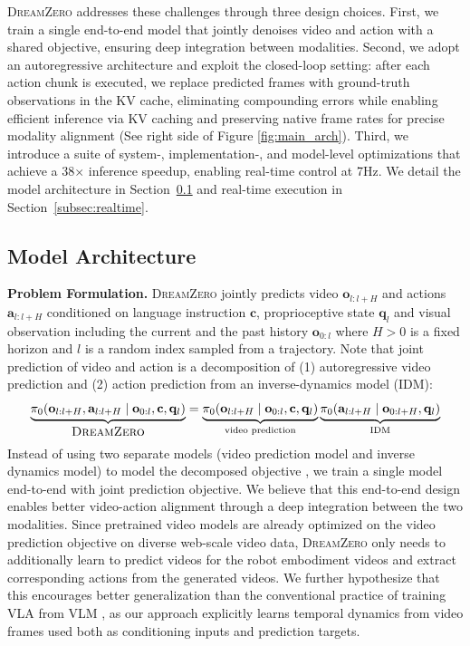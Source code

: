 \documentclass[10pt,logo,copyright]{nvidiatechreport}
\newcommand{\ourmethod}{\mbox{\textsc{DreamZero}}\xspace}
\begin{document}
\ourmethod addresses these challenges through three design choices. First, we train a single end-to-end model that jointly denoises video and action with a shared objective, ensuring deep integration between modalities. Second, we adopt an autoregressive architecture and exploit the closed-loop setting: after each action chunk is executed, we replace predicted frames with ground-truth observations in the KV cache, eliminating compounding errors while enabling efficient inference via KV caching and preserving native frame rates for precise modality alignment (See right side of Figure \ref{fig:main_arch}). Third, we introduce a suite of system-, implementation-, and model-level optimizations that achieve a 38$\times$ inference speedup, enabling real-time control at 7Hz. We detail the model architecture in Section~\ref{subsec:arch} and real-time execution in Section~\ref{subsec:realtime}.


\subsection{Model Architecture}
\label{subsec:arch}
\textbf{Problem Formulation.} \ourmethod jointly predicts video $\mathbf{o}_{l:l+H}$ and actions $\mathbf{a}_{l:l+H}$ conditioned on language instruction $\mathbf{c}$, proprioceptive state $\mathbf{q}_l$ and visual observation including the current and the past history $\mathbf{o}_{0:l}$ where $H>0$ is a fixed horizon and $l$ is a random index sampled from a trajectory. Note that joint prediction of video and action is a decomposition of (1) autoregressive video prediction and (2) action prediction from an inverse-dynamics model (IDM): 
\begin{equation}
    \underbrace{\pi_0(\mathbf{o}_{l:l+H}, \mathbf{a}_{l:l+H} \mid \mathbf{o}_{0:l}, \mathbf{c}, \mathbf{q}_l)}_{\ourmethod} = \underbrace{\pi_0(\mathbf{o}_{l:l+H} \mid \mathbf{o}_{0:l}, \mathbf{c}, \mathbf{q}_l)}_{\text{video prediction}} \underbrace{\pi_0(\mathbf{a}_{l:l+H} \mid \mathbf{o}_{0:l+H}, \mathbf{q}_l)}_{\text{IDM}}
\label{eq:joint_pred}
\end{equation}
Instead of using two separate models (video prediction model and inverse dynamics model) to model the decomposed objective \citep{lingbot-va2026, pai2025mimic}, we train a single model end-to-end with joint prediction objective. We believe that this end-to-end design enables better video-action alignment through a deep integration between the two modalities. Since pretrained video models are already optimized on the video prediction objective on diverse web-scale video data, \ourmethod only needs to additionally learn to predict videos for the robot embodiment videos and extract corresponding actions from the generated videos. We further hypothesize that this encourages better generalization than the conventional practice of training VLA from VLM 
, as our approach explicitly learns temporal dynamics from video frames used both as conditioning inputs and prediction targets.
\end{document}
